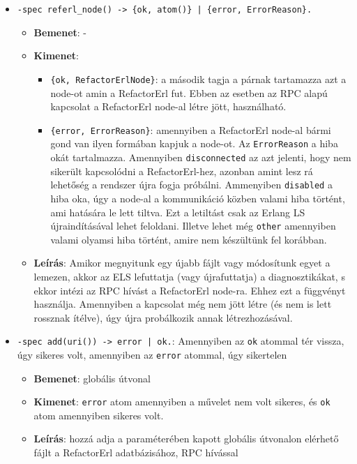 \begin{itemize}
    \item \lstinline'-spec referl_node() -> {ok, atom()} | {error, ErrorReason}. '
        \begin{itemize}
            \item \textbf{Bemenet}: -
            \item \textbf{Kimenet}: 
            \begin{itemize}
                \item \lstinline|{ok, RefactorErlNode}|: a második tagja a párnak tartamazza azt a node-ot amin a RefactorErl fut. Ebben az esetben az RPC alapú kapcsolat a RefactorErl node-al létre jött, használható.
                \item \lstinline|{error, ErrorReason}|: amennyiben a RefactorErl node-al bármi gond van ilyen formában kapjuk a node-ot. Az \lstinline{ErrorReason} a hiba okát tartalmazza. Amennyiben \lstinline{disconnected} az azt jelenti, hogy nem sikerült kapcsolódni a RefactorErl-hez, azonban amint lesz rá lehetőség a rendszer újra fogja próbálni. Ammenyiben \lstinline{disabled} a hiba oka, úgy a node-al a kommunikáció közben valami hiba történt, ami hatására le lett tiltva. Ezt a letiltást csak az Erlang LS újraindításával lehet feloldani. Illetve lehet még \lstinline{other} amennyiben valami olyamsi hiba történt, amire nem készültünk fel korábban.
            \end{itemize}
            \item \textbf{Leírás}: Amikor megnyitunk egy újabb fájlt vagy módosítunk egyet a lemezen, akkor az ELS  lefuttatja (vagy újrafuttatja) a diagnosztikákat, s ekkor intézi az RPC hívást a RefactorErl node-ra. Ehhez ezt a függvényt használja. Amennyiben a kapcsolat még nem jött létre (és nem is lett rossznak ítélve), úgy újra probálkozik annak létrezhozásával.
        \end{itemize}
    
    
    
    \item \lstinline{-spec add(uri()) -> error | ok.}:  Amennyiben az \lstinline{ok} atommal tér vissza, úgy sikeres volt, amennyiben az 
    \lstinline{error} atommal, úgy sikertelen
    \begin{itemize}
            \item \textbf{Bemenet}: globális útvonal
            \item \textbf{Kimenet}: \lstinline{error} atom amennyiben a művelet nem volt sikeres, és \lstinline{ok} atom amennyiben sikeres volt.
            \item \textbf{Leírás}: hozzá adja a paraméterében kapott globális útvonalon elérhető fájlt a RefactorErl adatbázisához, RPC hívással
        \end{itemize}
    

\end{itemize}
